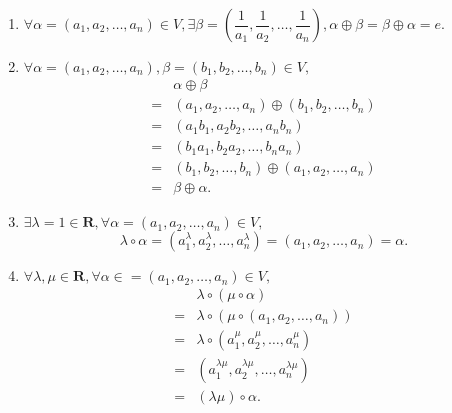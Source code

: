 \begin{solution}
\begin{enumerate}
\begin{enumerate}
                    \item $\forall \alpha = (a_1, a_2, \ldots, a_n) \in V, \exists \beta = (\dfrac{1}{a_1}, \dfrac{1}{a_2}, \ldots, \dfrac{1}{a_n}), \alpha \oplus \beta = \beta \oplus \alpha = e.$

                    \item $\forall \alpha = (a_1, a_2, \ldots, a_n), \beta = (b_1, b_2, \ldots, b_n) \in V,$
                    \begin{align*}
                        & \alpha \oplus \beta \\ ={} & (a_1, a_2, \ldots, a_n) \oplus (b_1, b_2, \ldots, b_n) \\ ={} & (a_1b_1, a_2b_2, \ldots, a_nb_n) \\ ={} & (b_1a_1, b_2a_2, \ldots, b_na_n) \\ ={} & (b_1, b_2, \ldots, b_n) \oplus (a_1, a_2, \ldots, a_n) \\ ={} & \beta \oplus \alpha.
                    \end{align*}

                    \item $\exists \lambda = 1 \in \mathbf{R}, \forall \alpha = (a_1, a_2, \ldots, a_n) \in V,$
                    \[\lambda \circ \alpha = (a_1^\lambda, a_2^\lambda, \ldots, a_n^\lambda) = (a_1, a_2, \ldots, a_n) = \alpha.\]

                    \item $\forall \lambda, \mu \in \mathbf{R}, \forall \alpha \in = (a_1, a_2, \ldots, a_n) \in V,$
                    \begin{align*}
                        & \lambda \circ(\mu \circ \alpha) \\ ={} & \lambda \circ(\mu \circ (a_1, a_2, \ldots, a_n)) \\ ={} & \lambda \circ (a_1^\mu, a_2^\mu, \ldots, a_n^\mu) \\ ={} & (a_1^{\lambda\mu}, a_2^{\lambda\mu}, \ldots, a_n^{\lambda\mu}) \\ ={} & (\lambda \mu)\circ \alpha.
                    \end{align*}


\end{enumerate}
\end{enumerate}
\end{solution}
